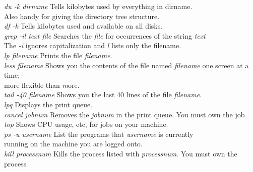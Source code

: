 \begin{tabbing}
\textit{du -k dirname} \> Tells kilobytes used by everything in dirname. \\
\>Also handy for giving the directory tree structure. \\

\textit{df -k} \> Tells kilobytes used and available on all disks. \\


\textit{grep -il text file} \> Searches the \textit{file} for occurrences of
the string \textit{text} \\
\> The {\it -i} ignores capitalization and {\it l} lists only the filename.\\
\textit{lp filename} \> Prints the file \textit{filename}. \\
\textit{less filename} \> Shows you the contents of the file named 
\textit{filename} one screen at a time; \\
\> more flexible than {\textit more}. \\
\textit{tail -40 filename} \> Shows you the last 40 lines of the file
{\it filename}. \\
\textit{lpq} \> Displays the print queue. \\
\textit{cancel jobnum} \> Removes the \textit{jobnum} in the print
queue. You must own the job \\

\textit{top} \> Shows CPU usage, etc, for jobs on your machine. \\
\textit{ps -u username} \> List the programs that \textit{username} is
currently \\
\>  running on the machine you are logged onto. \\
\textit{kill processnum} \> Kills the process listed with
\textit{processnum}. You must own the process \\
\end{tabbing}
	






